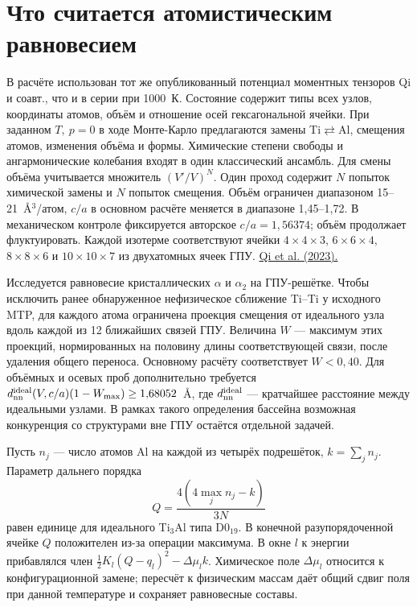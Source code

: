 \section*{Что считается атомистическим равновесием}
В расчёте использован тот же опубликованный потенциал моментных тензоров
Qi и соавт., что и в серии при 1000~К. Состояние содержит типы всех
узлов, координаты атомов, объём и отношение осей гексагональной ячейки.
При заданном \(T,\ p=0\) в ходе Монте-Карло предлагаются замены
Ti\(\rightleftarrows\)Al, смещения атомов, изменения объёма и формы.
Химические степени свободы и ангармонические колебания входят в один
классический ансамбль. Для смены объёма учитывается множитель
\((V'/V)^N\). Один проход содержит \(N\) попыток химической замены и
\(N\) попыток смещения. Объём ограничен диапазоном 15--21~\AA$^3$/атом,
\(c/a\) в основном расчёте меняется в диапазоне 1,45--1,72.
В механическом контроле фиксируется авторское \(c/a=1{,}56374\);
объём продолжает флуктуировать. Каждой изотерме соответствуют ячейки
\(4\times4\times3\), \(6\times6\times4\), \(8\times8\times6\) и
\(10\times10\times7\) из двухатомных ячеек ГПУ.
\href{https://doi.org/10.1103/PhysRevMaterials.7.103602}{Qi et al. (2023).}

Исследуется равновесие кристаллических \(\alpha\) и \(\alpha_2\) на
ГПУ-решётке. Чтобы исключить ранее обнаруженное нефизическое сближение
Ti--Ti у исходного MTP, для каждого атома ограничена проекция смещения
от идеального узла вдоль каждой из 12 ближайших связей ГПУ. Величина
\(W\) --- максимум этих проекций, нормированных на половину длины соответствующей связи,
после удаления общего переноса. Основному расчёту соответствует
\(W<0{,}40\). Для объёмных и осевых проб дополнительно требуется
\(d_{\rm nn}^{\rm ideal}(V,c/a)(1-W_{\max})\ge1{,}68052\)~\AA,
где \(d_{\rm nn}^{\rm ideal}\) --- кратчайшее расстояние между идеальными узлами.
В рамках такого определения бассейна возможная конкуренция
со структурами вне ГПУ остаётся отдельной задачей.

Пусть \(n_j\) --- число атомов Al на каждой из четырёх подрешёток,
\(k=\sum_jn_j\). Параметр дальнего порядка
\[
 Q=\frac{4(4\max_j n_j-k)}{3N}
\]
равен единице для идеального Ti$_3$Al типа D0$_{19}$. В конечной
разупорядоченной ячейке \(Q\) положителен из-за операции максимума.
В окне \(l\) к энергии прибавлялся член
\(\frac12 K_l(Q-q_l)^2-\Delta\mu_l k\).
Химическое поле \(\Delta\mu_l\) относится к конфигурационной замене;
пересчёт к физическим массам даёт общий сдвиг поля при данной
температуре и сохраняет равновесные составы.

